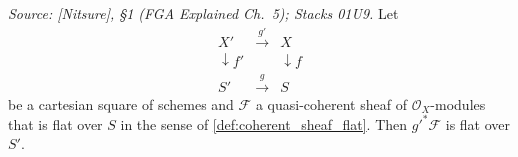 \begin{lemma}\leanok
  \label{lem:coherent_flat_base_change}
  \textit{Source: [Nitsure], \S 1 (FGA Explained Ch.~5); Stacks 01U9.}
  Let
  \[
    \begin{array}{ccc}
      X' & \xrightarrow{\ g'\ } & X \\
      \downarrow f' & & \downarrow f \\
      S' & \xrightarrow{\ g\ } & S
    \end{array}
  \]
  be a cartesian square of schemes and \(\mathcal{F}\) a quasi-coherent sheaf
  of \(\mathcal{O}_X\)-modules that is flat over \(S\) in the sense of
  \cref{def:coherent_sheaf_flat}.  Then \(g'^* \mathcal{F}\) is flat over
  \(S'\).
\end{lemma}
